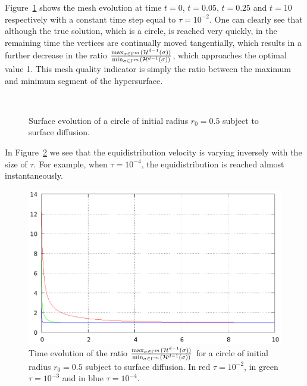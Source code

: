 Figure~\ref{fig:sd_circle} shows the mesh evolution at time $t=0$, $t=0.05$,
$t=0.25$ and $t=10$ respectively with a constant time step equal to
$\tau=10^{-2}$. One can clearly see that although the true solution, which is a
circle, is reached very quickly, in the remaining time the vertices are
continually moved tangentially, which results in a further decrease in the ratio
$\frac{\max_{\sigma\in \Gamma^m}(\mathcal{H}^{d-1}(\sigma))}
{\min_{\sigma\in\Gamma^m}(\mathcal{H}^{d-1}(\sigma))}$, which approaches the optimal
value 1. This mesh quality indicator is simply the ratio between the maximum
and minimum segment of the hypersurface.

\begin{figure}[htbp]
\centering
{}
\quad
{}
\\
\quad
{}
\caption[Surface diffusion equidistribution property]{Surface evolution of a
circle of initial radius $r_0=0.5$ subject to surface diffusion.}
\label{fig:sd_circle}
\end{figure}

In Figure~\ref{fig:sd_circle_tau} we see that the equidistribution velocity is
varying inversely with the size of $\tau$. For example, when $\tau=10^{-4}$,
the equidistribution is reached almost instantaneously.

\begin{figure}[htbp]
\centering
\includegraphics[width=.45\textwidth]
{figures/geometric_pdes/sd_circle_tau.ps}
\caption[Surface diffusion equidistribution velocity]{Time evolution of the
ratio $\frac{\max_{\sigma\in \Gamma^m}(\mathcal{H}^{d-1}(\sigma))}
{\min_{\sigma\in\Gamma^m}(\mathcal{H}^{d-1}(\sigma))}$ for a circle of initial radius
$r_0=0.5$ subject to surface diffusion. In red $\tau=10^{-2}$, in green
$\tau=10^{-3}$ and in blue $\tau=10^{-4}$.}
\label{fig:sd_circle_tau}
\end{figure}

